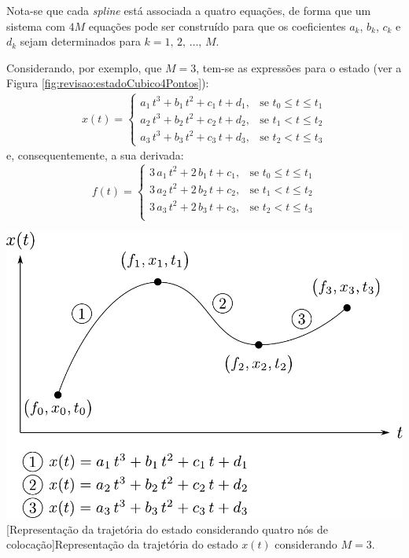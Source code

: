 Nota-se que cada \textit{spline} está associada a quatro equações, de forma que um sistema com $ 4M $ equações pode ser construído para que os coeficientes $ a_k $, $ b_k $, $ c_k $ e $ d_k $ sejam determinados para $ k = 1, \, 2, \, \dots, \, M $. 

Considerando, por exemplo, que $ M = 3 $, tem-se as expressões para o estado (ver a Figura \ref{fig:revisao:estadoCubico4Pontos}):
%
\begin{equation}
	\begin{gathered}
		x(t) = 
		\begin{cases} 
			a_1 \, t^3 + b_1 \, t^2 + c_1 \, t + d_1, & \mbox{se } t_0 \leq t \leq t_1 \\
			a_2 \, t^3 + b_2 \, t^2 + c_2 \, t + d_2, & \mbox{se } t_1 < t \leq t_2 \\
			a_3 \, t^3 + b_3 \, t^2 + c_3 \, t + d_3, & \mbox{se } t_2 < t \leq t_3 
		\end{cases}
	\end{gathered}
\end{equation} 
%
e, consequentemente, a sua derivada:
%
\begin{equation}
	f(t) = 
	\begin{cases}
		3 \, a_1 \, t^2 + 2 \, b_1 \, t + c_1, & \mbox{se } t_0 \leq t \leq t_1 \\ 
		3 \, a_2 \, t^2 + 2 \, b_2 \, t + c_2, & \mbox{se } t_1 < t \leq t_2 \\ 
		3 \, a_3 \, t^2 + 2 \, b_3 \, t + c_3, & \mbox{se } t_2 < t \leq t_3 \\ 
	\end{cases}
\end{equation}

\noindent	
\begin{minipage}{\textwidth}
	\vspace{\onelineskip}
	\centering
	\includegraphics[width=0.8\linewidth]{draw/revisao/pdf/estadoCubico4pontos}
	[Representação da trajetória do estado considerando quatro nós de colocação]{Representação da trajetória do estado $ x(t) $ considerando $ M = 3 $.}
	\label{fig:revisao:estadoCubico4Pontos}
	\vspace{\onelineskip}
\end{minipage}

